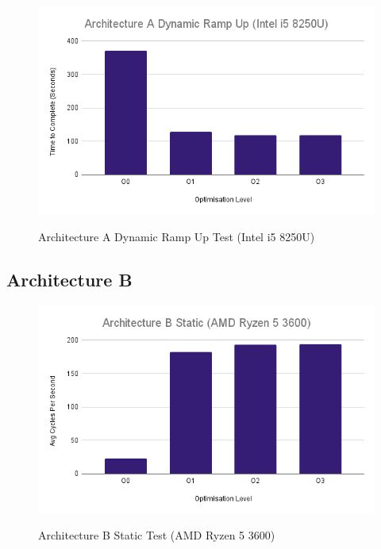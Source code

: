 \documentclass{article}
\begin{document}
\begin{figure}[!h]
\centering
\includegraphics[scale=0.5]{Architecture A Dynamic Ramp Up (Intel i5 8250U).png}
\label{arch_a_dynamic_ramp_up_laptop}
\caption{Architecture A Dynamic Ramp Up Test (Intel i5 8250U)}
\end{figure}

\clearpage

\subsection{Architecture B}
\begin{figure}[!h]
\centering
\includegraphics[scale=0.5]{Architecture B Static (AMD Ryzen 5 3600).png}
\label{arch_b_static_pc}
\caption{Architecture B Static Test (AMD Ryzen 5 3600)}
\end{figure}
\end{document}
